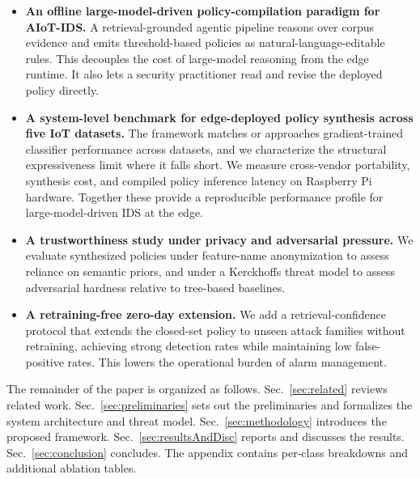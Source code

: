 \begin{itemize}
    \item \textbf{An offline large-model-driven policy-compilation paradigm
    for AIoT-IDS.} A retrieval-grounded agentic pipeline reasons over corpus evidence and emits threshold-based policies as natural-language-editable rules. This decouples the cost of large-model reasoning from the edge runtime. It also lets a security practitioner read and revise the deployed policy directly.

    \item \textbf{A system-level benchmark for edge-deployed policy synthesis across five IoT datasets.} The framework matches or approaches gradient-trained classifier performance across datasets, and we characterize the structural expressiveness limit where it falls short. We measure cross-vendor portability, synthesis cost, and compiled policy inference latency on Raspberry Pi hardware. Together these provide a reproducible performance profile for large-model-driven IDS at the edge.

    \item \textbf{A trustworthiness study under privacy and adversarial pressure.} We evaluate synthesized policies under feature-name anonymization to assess reliance on semantic priors, and under a Kerckhoffs threat model to assess adversarial hardness relative to tree-based baselines.

    \item \textbf{A retraining-free zero-day extension.} We add a retrieval-confidence protocol that extends the closed-set policy to unseen attack families without retraining, achieving strong detection rates while maintaining low false-positive rates. This lowers the operational burden of alarm management.
\end{itemize}

The remainder of the paper is organized as follows.
Sec.~\ref{sec:related} reviews related work. Sec.~\ref{sec:preliminaries}
sets out the preliminaries and formalizes the system architecture and threat
model. Sec.~\ref{sec:methodology} introduces the proposed framework.
Sec.~\ref{sec:resultsAndDisc} reports and discusses the results.
Sec.~\ref{sec:conclusion} concludes. The appendix contains per-class
breakdowns and additional ablation tables.
